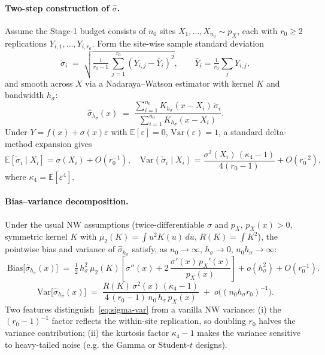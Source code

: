 \documentclass[11pt]{article}
\theoremstyle{remark}
\begin{document}
\paragraph{Two-step construction of $\hat\sigma$.}
Assume the Stage-1 budget consists of $n_0$ sites
$X_1,\dots,X_{n_0} \sim p_X$, each with $r_0 \ge 2$ replications
$Y_{i,1},\dots,Y_{i,r_0}$. Form the site-wise sample standard
deviation
\[
\tilde\sigma_i
  \;=\; \sqrt{\tfrac{1}{r_0 - 1}\,\textstyle\sum_{j=1}^{r_0}
                    (Y_{i,j} - \bar Y_i)^2},
\qquad
\bar Y_i = \tfrac{1}{r_0}\sum_j Y_{i,j},
\]
and smooth across $X$ via a Nadaraya--Watson estimator with kernel
$K$ and bandwidth $h_\sigma$:
\begin{equation}\label{eq:nw-sigma}
\hat\sigma_{h_\sigma}(x)
  \;=\;
  \frac{\sum_{i=1}^{n_0} K_{h_\sigma}(x - X_i)\,\tilde\sigma_i}
       {\sum_{i=1}^{n_0} K_{h_\sigma}(x - X_i)}.
\end{equation}
Under $Y = f(x) + \sigma(x)\varepsilon$ with
$\mathbb{E}[\varepsilon]=0$, $\mathrm{Var}(\varepsilon)=1$, a
standard delta-method expansion gives
\[
\mathbb{E}[\tilde\sigma_i \mid X_i] = \sigma(X_i) + O(r_0^{-1}),
\quad
\mathrm{Var}(\tilde\sigma_i \mid X_i)
   = \frac{\sigma^2(X_i)\,(\kappa_4 - 1)}{4(r_0-1)} + O(r_0^{-2}),
\]
where $\kappa_4 = \mathbb{E}[\varepsilon^4]$.

\paragraph{Bias--variance decomposition.}
Under the usual NW assumptions (twice-differentiable $\sigma$ and
$p_X$, $p_X(x)>0$, symmetric kernel $K$ with $\mu_2(K)=\int u^2
K(u)\,du$, $R(K) = \int K^2$), the pointwise bias and variance of
$\hat\sigma_{h_\sigma}$ satisfy, as $n_0\to\infty$, $h_\sigma\to
0$, $n_0 h_\sigma \to \infty$:
\begin{equation}\label{eq:sigma-bias}
\boxed{\;
\mathrm{Bias}\bigl[\hat\sigma_{h_\sigma}(x)\bigr]
  \;=\; \tfrac{1}{2}\,h_\sigma^{2}\,\mu_2(K)\!
        \left[\sigma''(x) + 2\,\frac{\sigma'(x)\,p_X'(x)}{p_X(x)}\right]
       + o(h_\sigma^{2}) + O(r_0^{-1}).
\;}
\end{equation}
\begin{equation}\label{eq:sigma-var}
\boxed{\;
\mathrm{Var}\bigl[\hat\sigma_{h_\sigma}(x)\bigr]
  \;=\;
  \frac{R(K)\,\sigma^{2}(x)\,(\kappa_4 - 1)}
       {4\,(r_0-1)\,n_0\,h_\sigma\,p_X(x)}
  \;+\; o\bigl((n_0 h_\sigma r_0)^{-1}\bigr).
\;}
\end{equation}
Two features distinguish~\eqref{eq:sigma-var} from a vanilla NW
variance: (i) the $(r_0-1)^{-1}$ factor reflects the within-site
replication, so doubling $r_0$ halves the variance contribution;
(ii) the kurtosis factor $\kappa_4-1$ makes the variance sensitive
to heavy-tailed noise (e.g. the Gamma or Student-$t$ designs).
\end{document}

